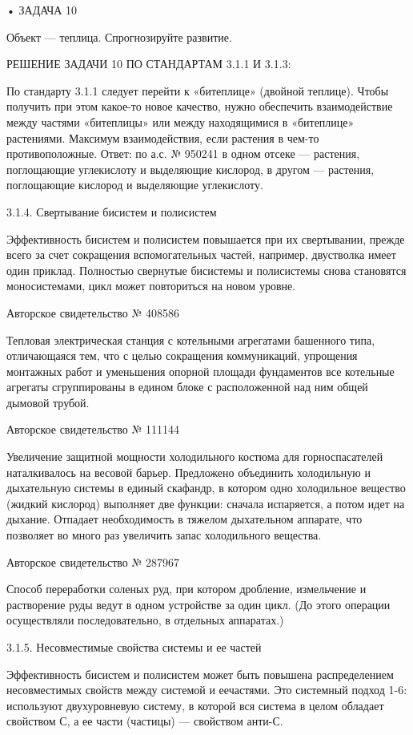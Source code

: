 • ЗАДАЧА 10

Объект — теплица. Спрогнозируйте развитие.


РЕШЕНИЕ ЗАДАЧИ 10 ПО СТАНДАРТАМ 3.1.1 И 3.1.3:

По стандарту  3.1.1 следует  перейти к «битеплице»  (двойной теплице).
Чтобы  получить при  этом  какое-то новое  качество, нужно  обеспечить
взаимодействие  между частями  «битеплицы»  или  между находящимися  в
«битеплице»  растениями.  Максимум  взаимодействия,  если  растения  в
чем-то  противоположные. Ответ:  по а.с.  №  950241 в  одном отсеке  —
растения, поглощающие  углекислоту и  выделяющие кислород, в  другом —
растения, поглощающие кислород и выделяющие углекислоту.


3.1.4. Свертывание бисистем и полисистем

Эффективность  бисистем и  полисистем повышается  при их  свертывании,
прежде  всего за  счет  сокращения  вспомогательных частей,  например,
двустволка  имеет  один  приклад.   Полностью  свернутые  бисистемы  и
полисистемы снова становятся моносистемами,  цикл может повториться на
новом уровне.


Авторское свидетельство № 408586

Тепловая электрическая станция с котельными агрегатами башенного типа,
отличающаяся  тем,  что  с целью  сокращения  коммуникаций,  упрощения
монтажных работ и уменьшения опорной площади фундаментов все котельные
агрегаты сгруппированы  в едином блоке  с расположенной над  ним общей
дымовой трубой.


Авторское свидетельство № 111144

Увеличение защитной мощности  холодильного костюма для горноспасателей
наталкивалось на  весовой барьер. Предложено объединить  холодильную и
дыхательную  системы в  единый  скафандр, в  котором одно  холодильное
вещество (жидкий кислород) выполняет  две функции: сначала испаряется,
а потом идет на дыхание.  Отпадает необходимость в тяжелом дыхательном
аппарате,  что позволяет  во  много раз  увеличить запас  холодильного
вещества.


Авторское свидетельство № 287967

Способ переработки  соленых руд, при котором  дробление, измельчение и
растворение  руды ведут  в одном  устройстве за  один цикл.  (До этого
операции осуществляли последовательно, в отдельных аппаратах.)


3.1.5. Несовместимые свойства системы и ее частей

Эффективность бисистем и полисистем может быть повышена распределением
несовместимых свойств между системой и еечастями. Это системный подход
1-6: используют двухуровневую  систему, в которой вся  система в целом
обладает свойством С, а ее части (частицы) — свойством анти-С.


